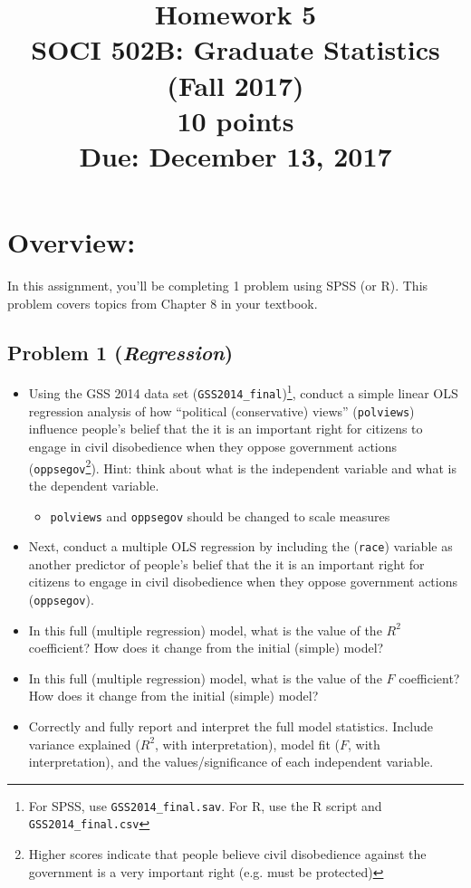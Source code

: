 \documentclass{article}
\begin{document}
\title{Homework 5\\ SOCI 502B: Graduate Statistics (Fall 2017) \\ {\large{10 points}} \\ {\large{Due: December 13, 2017}}}
\author[*]{}
\date{}
\maketitle



\section*{Overview:}
In this assignment, you'll be completing 1 problem using SPSS (or R). This problem covers topics from Chapter 8 in your textbook.

\subsection*{Problem 1 (\textit{Regression})}
\begin{itemize}
\item Using the GSS 2014 data set (\texttt{GSS2014\_final})\footnote{For SPSS, use \texttt{GSS2014\_final.sav}. For R, use the R script and \texttt{GSS2014\_final.csv}}, conduct a simple linear OLS regression analysis of how ``political (conservative) views'' (\texttt{polviews}) influence people's belief that the it is an important right for citizens to engage in civil disobedience when they oppose government actions (\texttt{oppsegov}\footnote{Higher scores indicate that people believe civil disobedience against the government is a very important right (e.g. must be protected)}). Hint: think about what is the independent variable and what is the dependent variable.
\begin{itemize}
\item \texttt{polviews} and \texttt{oppsegov} should be changed to scale measures
\end{itemize}
\item Next, conduct a multiple OLS regression by including the (\texttt{race}) variable as another predictor of people's belief that the it is an important right for citizens to engage in civil disobedience when they oppose government actions (\texttt{oppsegov}).
\item In this full (multiple regression) model, what is the value of the $R^{2}$ coefficient? How does it change from the initial (simple) model?
\item In this full (multiple regression) model, what is the value of the $F$ coefficient? How does it change from the initial (simple) model?
\item Correctly and fully report and interpret the full model statistics. Include variance explained ($R^{2}$, with interpretation), model fit ($F$, with interpretation), and the values/significance of each independent variable.
\end{itemize}
\end{document}
